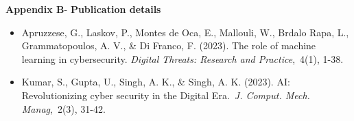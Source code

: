 \begin{center}
	{\Large \textbf{Appendix B}}-\vspace*{0.5 cm}
	{\Large \textbf{Publication details}}
\end{center}
\begin{center}
	\begin{itemize}
		\item Apruzzese, G., Laskov, P., Montes de Oca, E., Mallouli, W., Brdalo Rapa, L., Grammatopoulos, A. V., \& Di Franco, F. (2023). The role of machine learning in cybersecurity. \textit{Digital Threats: Research and Practice}, 4(1), 1-38.
		\item Kumar, S., Gupta, U., Singh, A. K., \& Singh, A. K. (2023). AI: Revolutionizing cyber security in the Digital Era. \textit{J. Comput. Mech. Manag}, 2(3), 31-42.
	\end{itemize}
	
\end{center}
